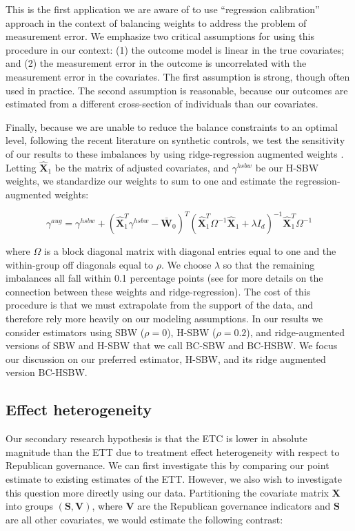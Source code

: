 \documentclass[aoas]{imsart}
\theoremstyle{plain}
\newcommand{\matr}[1]{\mathbf{#1}} %
\theoremstyle{remark}
\begin{document}
This is the first application we are aware of to use ``regression calibration'' approach in the context of balancing weights to address the problem of measurement error. We emphasize two critical assumptions for using this procedure in our context: (1) the outcome model is linear in the true covariates; and (2) the measurement error in the outcome is uncorrelated with the measurement error in the covariates. The first assumption is strong, though often used in practice. The second assumption is reasonable, because our outcomes are estimated from a different cross-section of individuals than our covariates. 

Finally, because we are unable to reduce the balance constraints to an optimal level, following the recent literature on synthetic controls, we test the sensitivity of our results to these imbalances by using ridge-regression augmented weights \cite{ben2018augmented}. Letting $\matr{\hat{X}}_1$ be the matrix of adjusted covariates, and $\gamma^{hsbw}$ be our H-SBW weights, we standardize our weights to sum to one and estimate the regression-augmented weights:

\begin{equation}
\gamma^{aug} = \gamma^{hsbw} + (\matr{\hat{X}}_1^T\gamma^{hsbw} - \bar{\matr{W}}_0)^T(\matr{\hat{X}}_1^T\Omega^{-1}\matr{\hat{X}}_1 + \lambda I_d)^{-1}\matr{\hat{X}}_1^T\Omega^{-1}
\end{equation}

where $\Omega$ is a block diagonal matrix with diagonal entries equal to one and the within-group off diagonals equal to $\rho$. We choose $\lambda$ so that the remaining imbalances all fall within 0.1 percentage points (see \cite{ben2018augmented} for more details on the connection between these weights and ridge-regression). The cost of this procedure is that we must extrapolate from the support of the data, and therefore rely more heavily on our modeling assumptions. In our results we consider estimators using SBW ($\rho = 0$), H-SBW ($\rho = 0.2$), and ridge-augmented versions of SBW and H-SBW that we call BC-SBW and BC-HSBW. We focus our discussion on our preferred estimator, H-SBW, and its ridge augmented version BC-HSBW. 

\subsection{Effect heterogeneity}

Our secondary research hypothesis is that the ETC is lower in absolute magnitude than the ETT due to treatment effect heterogeneity with respect to Republican governance. We can first investigate this by comparing our point estimate to existing estimates of the ETT. However, we also wish to investigate this question more directly using our data. Partitioning the covariate matrix $\matr{X}$ into groups $(\matr{S}, \matr{V})$, where $\matr{V}$ are the Republican governance indicators and $\matr{S}$ are all other covariates, we would estimate the following contrast:
\end{document}
